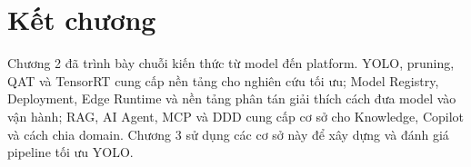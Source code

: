 \section{Kết chương}

Chương 2 đã trình bày chuỗi kiến thức từ model đến platform. YOLO, pruning, QAT
và TensorRT cung cấp nền tảng cho nghiên cứu tối ưu; Model Registry, Deployment,
Edge Runtime và nền tảng phân tán giải thích cách đưa model vào vận hành; RAG,
AI Agent, MCP và DDD cung cấp cơ sở cho Knowledge, Copilot và cách chia domain.
Chương 3 sử dụng các cơ sở này để xây dựng và đánh giá pipeline tối ưu YOLO.